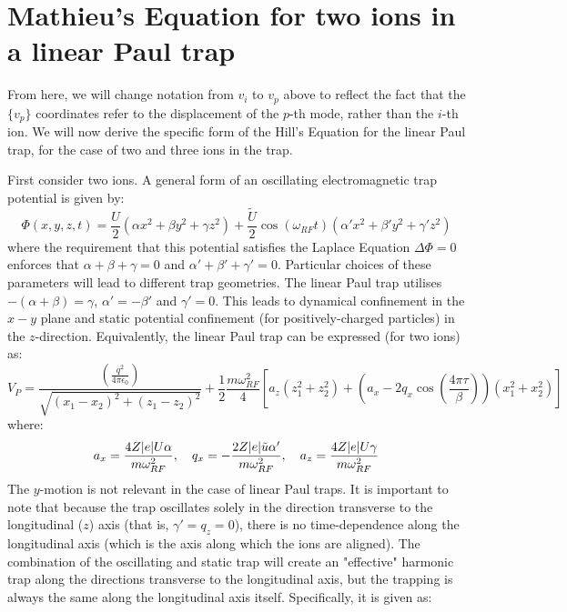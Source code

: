 \documentclass{article}
\begin{document}
\section{Mathieu's Equation for two ions in a linear Paul trap}
From here, we will change notation from $v_i$ to $v_p$ above to reflect the fact that the $ \{ v_p \}$ coordinates refer to the displacement of the $p$-th mode, rather than the $i$-th ion. We will now derive the specific form of the Hill's Equation for the linear Paul trap, for the case of two and three ions in the trap. \par
\medskip
\noindent First consider two ions. A general form of an oscillating electromagnetic trap potential is given by:
\begin{equation}
\Phi (x, y,z,t) = \frac{U}{2} (\alpha x^2 + \beta y^2 + \gamma z^2) + \frac{\tilde{U}}{2} \cos (\omega_{RF} t) (\alpha ' x^2 + \beta ' y^2 + \gamma ' z^2)	
\end{equation}
where the requirement that this potential satisfies the Laplace Equation $\Delta \Phi = 0$ enforces that $\alpha + \beta + \gamma = 0$ and $\alpha' + \beta' + \gamma' = 0$. Particular choices of these parameters will lead to different trap geometries. The linear Paul trap utilises $- (\alpha + \beta) = \gamma$, $\alpha ' = - \beta '$ and $\gamma ' = 0$. This leads to dynamical confinement in the $x-y$ plane and static potential confinement (for positively-charged particles) in the $z$-direction. Equivalently, the linear Paul trap can be expressed (for two ions) as:
\begin{equation}
	V_P = \frac{\left( \frac{q^2}{4 \pi \epsilon_0} \right)}{\sqrt{(x_1 - x_2)^2 + (z_1 - z_2)^2}}  + \frac{1}{2} \frac{m \omega_{RF}^2}{4} [ a_z (z_1^2 + z_2^2) + (a_x - 2 q_x \cos(\frac{4 \pi \tau}{\beta}) ) (x_1^2 + x_2^2) ]
\end{equation}
where:
\begin{equation}
a_x = \frac{4 Z \abs{e} U \alpha}{m \omega_{RF}^2}, \quad q_x = - \frac{2 Z \abs{e} \tilde{u} \alpha'}{m \omega_{RF}^2}, \quad a_z = \frac{4 Z \abs{e} U \gamma}{m \omega_{RF}^2}	
\end{equation}
The $y$-motion is not relevant in the case of linear Paul traps. It is important to note that because the trap oscillates solely in the direction transverse to the longitudinal ($z$) axis (that is, $\gamma' =q_z = 0$), there is no time-dependence along the longitudinal axis (which is the axis along which the ions are aligned). The combination of the oscillating and static trap will create an "effective" harmonic trap along the directions transverse to the longitudinal axis, but the trapping is always the same along the longitudinal axis itself. Specifically, it is given as:
\end{document}
